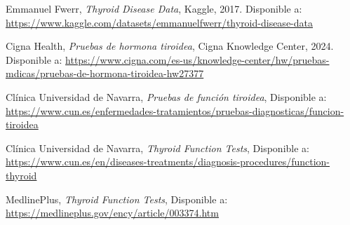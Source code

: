 \documentclass[9pt,a4paper,twoside]{tau-class/tau}
\begin{document}
    \begin{thebibliography}{9}

        Emmanuel Fwerr,
        \textit{Thyroid Disease Data},
        Kaggle, 2017.
        Disponible a: \url{https://www.kaggle.com/datasets/emmanuelfwerr/thyroid-disease-data}
        
        Cigna Health,
        \textit{Pruebas de hormona tiroidea},
        Cigna Knowledge Center, 2024.
        Disponible a: \url{https://www.cigna.com/es-us/knowledge-center/hw/pruebas-mdicas/pruebas-de-hormona-tiroidea-hw27377}

        Clínica Universidad de Navarra,
        \textit{Pruebas de función tiroidea},
        Disponible a: \url{https://www.cun.es/enfermedades-tratamientos/pruebas-diagnosticas/funcion-tiroidea}

        Clínica Universidad de Navarra,
        \textit{Thyroid Function Tests},
        Disponible a: \url{https://www.cun.es/en/diseases-treatments/diagnosis-procedures/function-thyroid}

        MedlinePlus,
        \textit{Thyroid Function Tests},
        Disponible a: \url{https://medlineplus.gov/ency/article/003374.htm}

    \end{thebibliography}
\end{document}
